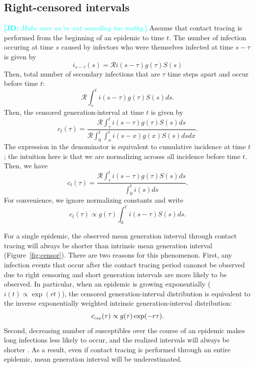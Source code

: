 \documentclass[12pt]{article}
\newcommand{\RR}{\ensuremath{{\mathcal R}}}
\newcommand{\tsub}[2]{#1_{{\textrm{\tiny #2}}}}
\newcommand{\comment}[3]{\textcolor{#1}{\textbf{[#2: }\textsl{#3}\textbf{]}}}
\newcommand{\jd}[1]{\comment{cyan}{JD}{#1}}
\begin{document}
\subsection{Right-censored intervals}

\jd{Make sure we're not sounding too mathy.}
Assume that contact tracing is performed from the beginning of an epidemic to time $t$.
The number of infection occuring at time $s$ caused by infectors who were themselves infected at time $s-\tau$ is given by
\begin{equation}
i_{s-\tau}(s) = \RR i(s-\tau) g(\tau) S(s)
\end{equation}
Then, total number of secondary infections that are $\tau$ time steps apart and occur before time $t$:
\begin{equation}
\RR \int_\tau^t i(s-\tau) g(\tau) S(s) ds.
\end{equation}
Then, the censored generation-interval at time $t$ is given by
\begin{equation}
c_t(\tau)= \frac{\RR \int_\tau^t i(s-\tau) g(\tau) S(s) ds}{\RR \int_0^t \int_x^t i(s-x) g(x) S(s) ds dx}.
\end{equation}
The expression in the denominator is equivalent to cumulative incidence at time $t$; the intuition here is that we are normalizing acrosss all incidence before time $t$.
Then, we have
\begin{equation}
c_t(\tau) = \frac{\RR \int_\tau^t i(s-\tau) g(\tau) S(s) ds}{\int_0^t i(s) ds}.
\end{equation}
For convenience, we ignore normalizing constants and write
\begin{equation}\label{eq:obsg}
c_t(\tau) \propto g(\tau) \int_{0}^t i(s-\tau) S(s) ds.
\end{equation}

For a single epidemic, the observed mean generation interval through contact tracing will always be shorter than intrinsic mean generation interval (Figure~\ref{fig:censor}).
There are two reasons for this phenomenon.
First, any infection events that occur after the contact tracing period canonot be observed due to right censoring and short generation intervals are more likely to be observed.
In particular, when an epidemic is growing exponentially ($i(t) \propto \exp(rt)$), 
the censored generation-interval distribution is equivalent to the inverse exponentially weighted intrinsic generation-interval distribution:
\begin{equation}
\tsub{c}{exp}(\tau) \propto g(\tau) \exp(-r\tau).
\label{eq:exp}
\end{equation}
Second, decreasing number of susceptibles over the course of an epidemic makes long infections less likely to occur, and the realized intervals will always be shorter \citep{champredon2015intrinsic}.
As a result, even if contact tracing is performed through an entire epidemic, mean generation interval will be underestimated.
\end{document}
